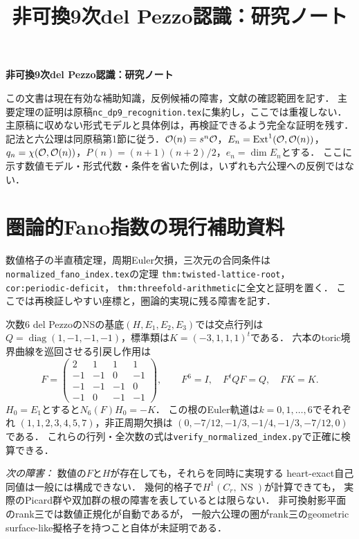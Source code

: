 \documentclass[11pt,a4paper]{ltjsarticle}
\title{非可換9次del Pezzo認識：研究ノート}
\author{}
\date{\versiondate}
\begin{document}
\begin{center}
{\Large\bfseries 非可換9次del Pezzo認識：研究ノート\par}
\vspace{0.8em}
\versiondate\par
\end{center}
\vspace{0.5em}
この文書は現在有効な補助知識，反例候補の障害，文献の確認範囲を記す．
主要定理の証明は原稿\texttt{nc\_dp9\_recognition.tex}に集約し，ここでは重複しない．
主原稿に収めない形式モデルと具体例は，再検証できるよう完全な証明を残す．
記法と六公理は同原稿第1節に従う．$\mathcal O(n)=s^n\mathcal O$，$E_n=\operatorname{Ext}^1(\mathcal O,\mathcal O(n))$，
$q_n=\chi(\mathcal O,\mathcal O(n))$，$P(n)=(n+1)(n+2)/2$，$e_n=\dim E_n$とする．
ここに示す数値モデル・形式代数・条件を省いた例は，いずれも六公理への反例ではない．
\begingroup\fontsize{11}{14}\selectfont
\tableofcontents
\endgroup

\section{圏論的Fano指数の現行補助資料}
数値格子の半直積定理，周期Euler欠損，三次元の合同条件は
\texttt{normalized\_fano\_index.tex}の定理
\texttt{thm:twisted-lattice-root}，\texttt{cor:periodic-deficit}，
\texttt{thm:threefold-arithmetic}に全文と証明を置く．
ここでは再検証しやすい座標と，圏論的実現に残る障害を記す．

次数6 del PezzoのNSの基底$(H,E_1,E_2,E_3)$では交点行列は
$Q=\operatorname{diag}(1,-1,-1,-1)$，標準類は$K=(-3,1,1,1)^t$である．
六本のtoric境界曲線を巡回させる引戻し作用は
\[
 F=\begin{pmatrix}
 2&1&1&1\\-1&-1&0&-1\\-1&-1&-1&0\\-1&0&-1&-1
 \end{pmatrix},\qquad
 F^6=I,\quad F^tQF=Q,\quad FK=K.
\]
$H_0=E_1$とすると$N_6(F)H_0=-K$．
この根のEuler軌道は$k=0,1,\ldots,6$でそれぞれ
$(1,1,2,3,4,5,7)$，非正周期欠損は
$(0,-7/12,-1/3,-1/4,-1/3,-7/12,0)$である．
これらの行列・全次数の式は\texttt{verify\_normalized\_index.py}で正確に検算できる．

\emph{次の障害：} 数値の$F$と$H$が存在しても，それらを同時に実現する
heart-exact自己同値は一般には構成できない．
幾何的格子で$H^1(C_r,\operatorname{NS})$が計算できても，
実際のPicard群や双加群の根の障害を表しているとは限らない．
非可換射影平面のrank三では数値正規化が自動であるが，
一般六公理の圏がrank三のgeometric surface-like擬格子を持つこと自体が未証明である．
\end{document}
